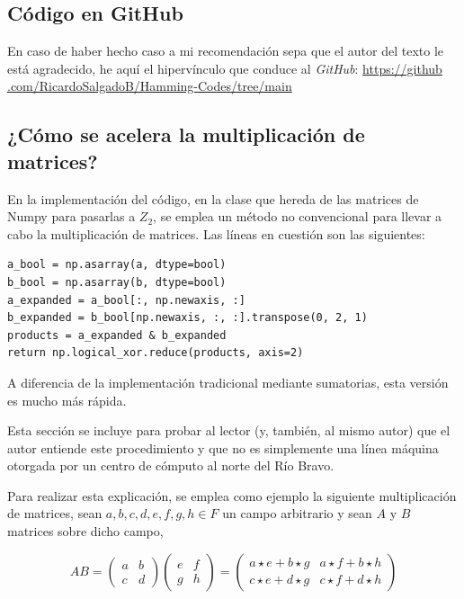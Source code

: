 \documentclass{article}
\begin{document}
\subsection{Código en GitHub}

En caso de haber hecho caso a mi recomendación sepa que el autor del texto le está agradecido, he aquí el hipervínculo que conduce al \textit{GitHub}: \href{https://github.com/RicardoSalgadoB/Hamming-Codes/tree/main}{https://github} \\ \href{https://github.com/RicardoSalgadoB/Hamming-Codes/tree/main}{.com/RicardoSalgadoB/Hamming-Codes/tree/main}

\subsection{¿Cómo se acelera la multiplicación de matrices?}

En la implementación del código, en la clase que hereda de las matrices de Numpy para pasarlas a $Z_2$, se emplea un método no convencional para llevar a cabo la multiplicación de matrices. Las líneas en cuestión son las siguientes:

\begin{verbatim}
a_bool = np.asarray(a, dtype=bool)
b_bool = np.asarray(b, dtype=bool)
a_expanded = a_bool[:, np.newaxis, :]
b_expanded = b_bool[np.newaxis, :, :].transpose(0, 2, 1)
products = a_expanded & b_expanded
return np.logical_xor.reduce(products, axis=2)  
\end{verbatim}

A diferencia de la implementación tradicional mediante sumatorias, esta versión es mucho más rápida. 

Esta sección se incluye para probar al lector (y, también, al mismo autor) que el autor entiende este procedimiento y que no es simplemente una línea máquina otorgada por un centro de cómputo al norte del Río Bravo.

Para realizar esta explicación, se emplea como ejemplo la siguiente multiplicación de matrices, sean $a, b, c, d, e, f, g, h \in F$ un campo arbitrario y sean $A$ y $B$ matrices sobre dicho campo, 

$$
A B = 
\begin{pmatrix}
    a & b \\
    c & d
\end{pmatrix}
\begin{pmatrix}
    e & f \\
    g & h
\end{pmatrix}
= \begin{pmatrix}
    a \star e + b \star g & a \star f + b \star h \\
    c \star e + d \star g & c \star f + d \star h
\end{pmatrix}
$$
\end{document}
